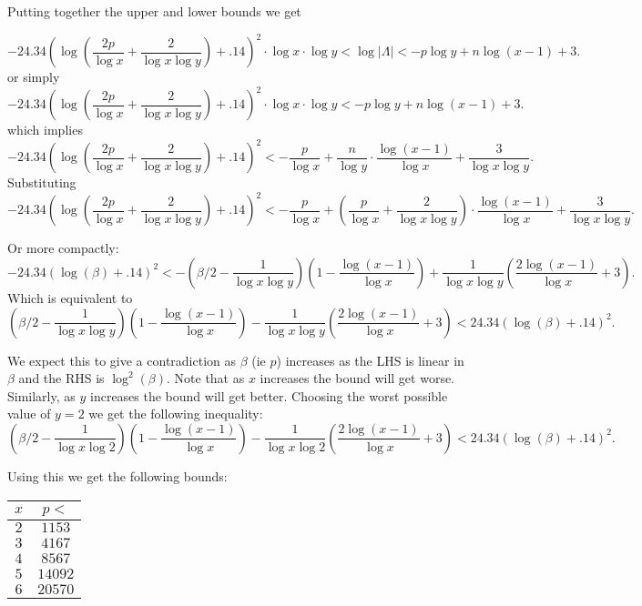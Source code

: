 \documentclass[12pt]{article}
\begin{document}
Putting together the upper and lower bounds we get

\[ -24.34 \left( \log{\left( \frac{2p}{\log{x}} + \frac{2}{\log{x}\log{y}} \right)}+.14 \right)^2 \cdot \log{x} \cdot \log{y} < \log|\Lambda| < -p\log{y} + n\log{(x-1)} +3. \]
or simply
\[ -24.34 \left( \log{\left( \frac{2p}{\log{x}} + \frac{2}{\log{x}\log{y}} \right)}+.14 \right)^2 \cdot \log{x} \cdot \log{y} <  -p\log{y} + n\log{(x-1)} +3. \]
which implies
\[ -24.34 \left( \log{\left( \frac{2p}{\log{x}} + \frac{2}{\log{x}\log{y}} \right)}+.14 \right)^2<  -\frac{p}{\log{x}} + \frac{n}{\log{y}} \cdot \frac{\log{(x-1)}}{\log{x}} + \frac{3}{\log{x}\log{y}}. \]
Substituting
\[ -24.34 \left( \log{\left( \frac{2p}{\log{x}} + \frac{2}{\log{x}\log{y}} \right)}+.14 \right)^2<  -\frac{p}{\log{x}} + \left( \frac{p}{\log{x}} + \frac{2}{\log{x}\log{y}} \right) \cdot \frac{\log{(x-1)}}{\log{x}} + \frac{3}{\log{x}\log{y}}. \]

Or more compactly:
\[ -24.34 \left( \log{\left(\beta \right)}+.14 \right)^2 < - \left( \beta/2 - \frac{1}{\log{x}\log{y}} \right)\left( 1 - \frac{\log{(x-1)}}{\log{x}} \right) + \frac{1}{\log{x}\log{y}} \left( \frac{2\log{(x-1)}}{\log{x}} +3 \right). \]
Which is equivalent to 
\[ \left( \beta/2 - \frac{1}{\log{x}\log{y}} \right)\left( 1 - \frac{\log{(x-1)}}{\log{x}} \right) - \frac{1}{\log{x}\log{y}} \left( \frac{2\log{(x-1)}}{\log{x}} +3 \right) < 24.34 \left( \log{\left(\beta \right)}+.14 \right)^2. \]

We expect this to give a contradiction as $\beta$ (ie $p$) increases as the LHS is linear in $\beta$ and the RHS is $\log^2(\beta)$.  Note that as $x$ increases the bound will get worse.  Similarly, as $y$ increases the bound will get better.  Choosing the worst possible value of $y=2$ we get the following inequality:
\[ \left( \beta/2 - \frac{1}{\log{x}\log{2}} \right)\left( 1 - \frac{\log{(x-1)}}{\log{x}} \right) - \frac{1}{\log{x}\log{2}} \left( \frac{2\log{(x-1)}}{\log{x}} +3 \right) < 24.34 \left( \log{\left(\beta \right)}+.14 \right)^2. \]

Using this we get the following bounds:
\begin{center}
\begin{tabular}{c c}
$x$ & $p <$ \\ \hline \hline
$2$ & $1153$ \\
$3$ & $4167$ \\
$4$ & $8567$ \\
$5$ & $14092$ \\
$6$ & $20570$ 
\\ \hline \hline
\end{tabular}
\end{center}
\end{document}
